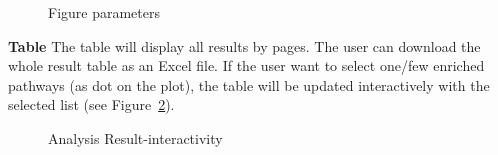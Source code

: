 \documentclass[
  a4paper,
  DIV=11,
  numbers=noendperiod,
  oneside,
  open=any]{scrreport}
\begin{document}
\begin{figure}[H]


\caption{\label{fig-path11}Figure parameters}

\end{figure}%

\textbf{Table} The table will display all results by pages. The user can
download the whole result table as an Excel file. If the user want to
select one/few enriched pathways (as dot on the plot), the table will be
updated interactively with the selected list (see
Figure~\ref{fig-path12}).

\begin{figure}[H]


\caption{\label{fig-path12}Analysis Result-interactivity}

\end{figure}%
\end{document}
